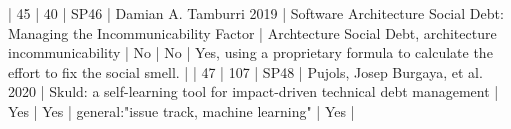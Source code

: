 | 45 |         40 | SP46 | Damian A. Tamburri 2019                                              | Software Architecture Social Debt: Managing the Incommunicability Factor                                                                                                 | Archtecture Social Debt, architecture incommunicability                                                                                                                                                                                                  | No                                                                                                                                                                                                                                                                 | No                                                                                                                                                                                                                                                                                                       | Yes, using a proprietary formula to calculate the effort to fix the social smell.                                                                                                                                                                                                                                                                                                                                                                                                        |
| 47 |        107 | SP48 | Pujols, Josep Burgaya, et al. 2020                                   | Skuld: a self-learning tool for impact-driven technical debt management                                                                                                  | Yes                                                                                                                                                                                                                                                      | Yes                                                                                                                                                                                                                                                                | general:"issue track, machine learning"                                                                                                                                                                                                                                                                  | Yes                                                                                                                                                                                                                                                                                                                                                                                                                                                                                      |
